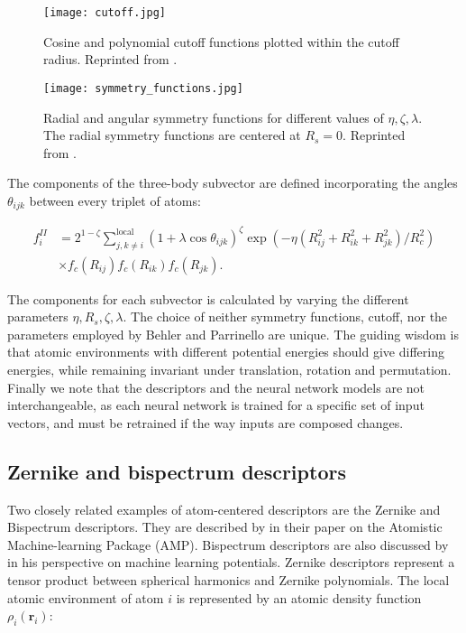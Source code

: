 \begin{figure}[H]
    \centering
    \texttt{[image: cutoff.jpg]}
    \caption{Cosine and polynomial cutoff functions plotted within
        the cutoff radius. Reprinted from \parencite[
            Khorshidi, Alireza and Peterson, Andrew A.]{khorshidi2016amp}.}
    \label{fig:cutoff}
\end{figure}

\begin{figure}[H]
    \centering
    \texttt{[image: symmetry\_functions.jpg]}
    \caption{Radial and angular symmetry functions for different values
        of $\eta, \zeta, \lambda$. The radial symmetry functions
        are centered at $R_s = 0$. Reprinted from \parencite[
            Khorshidi, Alireza and Peterson, Andrew A.]{khorshidi2016amp}.}
    \label{fig:symmetry-functions}
\end{figure}

The components of the three-body subvector are defined incorporating
the angles $\theta_{ijk}$ between every triplet of atoms:

\begin{equation}
\begin{split}
    f_i^{II} &= 2^{1 - \zeta} \sum_{j,k \neq i}^{\text{local}}
    (1 + \lambda \cos \theta_{ijk})^{\zeta}
    \exp \left( -\eta \left( R_{ij}^2 + R_{ik}^2 + R_{jk}^2
    \right) / R_c^2 \right) \\
    & \times f_c(R_{ij}) f_c(R_{ik}) f_c(R_{jk}) .
\end{split}
\end{equation}

The components for each subvector is calculated by varying
the different parameters $\eta, R_s, \zeta, \lambda$.
The choice of neither symmetry functions, cutoff, nor the parameters
employed by Behler and Parrinello are unique. The guiding
wisdom is that atomic environments with different
potential energies should give differing energies,
while remaining invariant under translation, rotation and permutation.
Finally we note that the descriptors and the neural network
models are not interchangeable, as each neural network
is trained for a specific set of input vectors, and must
be retrained if the way inputs are composed changes.

\subsection{Zernike and bispectrum descriptors}
Two closely related examples of atom-centered descriptors
are the Zernike and Bispectrum descriptors.
They are described by \parencite[Khorshidi, Alireza and Peterson,
Andrew A.]{khorshidi2016amp} in their paper
on the Atomistic Machine-learning Package (AMP).
Bispectrum descriptors are also discussed by
\parencite[Behler, J\"{o}rg]{behler2016perspective}
in his perspective on machine learning potentials.
Zernike descriptors represent a tensor product between spherical
harmonics and Zernike polynomials. The local atomic environment
of atom $i$ is represented by an atomic density function $\rho_i(\bm{r}_i)$:

